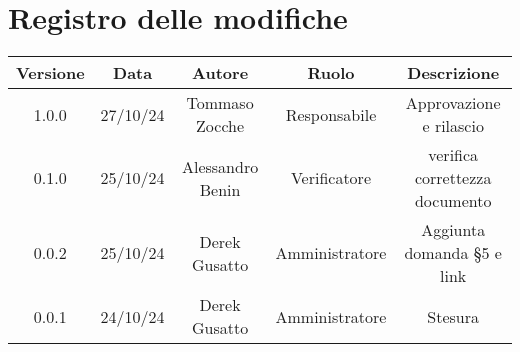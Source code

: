 
\section*{Registro delle modifiche}
\begin{table}[H]
    \begin{tabular}{|c|c|c|c|c|}
        \hline
         \textbf{Versione} &  \textbf{Data} &  \textbf{Autore} &  \textbf{Ruolo} & \textbf{Descrizione} \\
          \hline
          1.0.0 & 27/10/24 & Tommaso Zocche & Responsabile & Approvazione e rilascio\\
          \hline
          0.1.0& 25/10/24 & Alessandro Benin  & Verificatore  & verifica correttezza documento  \\
          \hline
          0.0.2& 25/10/24 & Derek Gusatto & Amministratore & Aggiunta domanda §5 e link  \\
          \hline
          0.0.1& 24/10/24 & Derek Gusatto & Amministratore & Stesura \\
          \hline
    \end{tabular}
\end{table}
